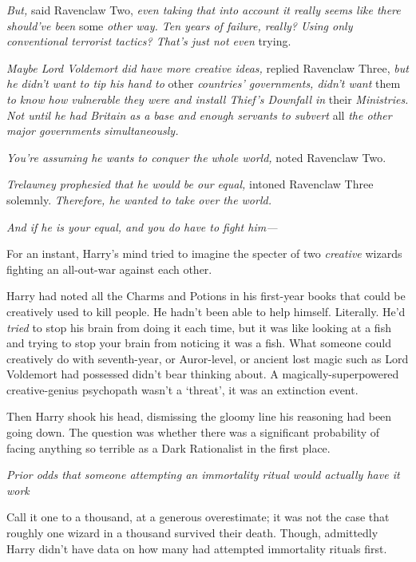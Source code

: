 \emph{But,} said Ravenclaw Two, \emph{even taking that into account{\el} it
really seems like there should've been} some \emph{other way. Ten years of
failure, really? Using only conventional terrorist tactics? That's just{\el}
not even} trying.

\emph{Maybe Lord Voldemort did have more creative ideas,} replied Ravenclaw
Three, \emph{but he didn't want to tip his hand to} other \emph{countries'
governments, didn't want} them \emph{to know how vulnerable they were and
install Thief's Downfall in} their \emph{Ministries. Not until he had Britain
as a base and enough servants to subvert} all \emph{the other major governments
simultaneously.}

\emph{You're assuming he wants to conquer the whole world,} noted Ravenclaw Two.

\emph{Trelawney prophesied that he would be our equal,} intoned Ravenclaw
Three solemnly. \emph{Therefore, he wanted to take over the world.}

\emph{And if he is your equal, and you do have to fight him---}

For an instant, Harry's mind tried to imagine the specter of two
\emph{creative} wizards fighting an all-out-war against each other.

Harry had noted all the Charms and Potions in his first-year books that could
be creatively used to kill people. He hadn't been able to help himself.
Literally. He'd \emph{tried} to stop his brain from doing it each time, but it
was like looking at a fish and trying to stop your brain from noticing it was a
fish. What someone could creatively do with seventh-year, or Auror-level, or
ancient lost magic such as Lord Voldemort had possessed{\el} didn't bear
thinking about. A magically-superpowered creative-genius psychopath wasn't a
`threat', it was an extinction event.

Then Harry shook his head, dismissing the gloomy line his reasoning had been
going down. The question was whether there was a significant probability of
facing anything so terrible as a Dark Rationalist in the first place.

\emph{Prior odds that someone attempting an immortality ritual would actually
have it work{\el}}

Call it one to a thousand, at a generous overestimate; it was not the case that
roughly one wizard in a thousand survived their death. Though, admittedly Harry
didn't have data on how many had attempted immortality rituals first.

